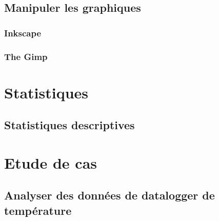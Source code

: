 \documentclass[]{book}
\begin{document}
\chapter{Manipuler les graphiques}\label{graph4}

\section{Inkscape}\label{inkscape}

\section{The Gimp}\label{the-gimp}

\part{Statistiques}\label{part-statistiques}

\chapter{Statistiques descriptives}\label{stats1}

\part{Etude de cas}\label{part-etude-de-cas}

\chapter{Analyser des données de datalogger de
température}\label{studyCase1}
\end{document}
